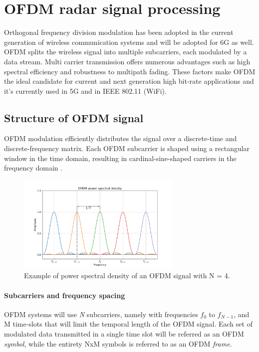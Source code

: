 \chapter{OFDM radar signal processing}
\label{chap:theoretical_OFDM}

Orthogonal frequency division modulation has been adopted in the current generation of wireless communication systems and will be adopted for 6G as well.
OFDM splits the wireless signal into multiple subcarriers, each modulated by a data stream. Multi carrier transmission offers numerous advantages such as high spectral efficiency and robustness to multipath fading. These factors make OFDM the ideal candidate for current and next generation high bit-rate applications and it's currently used in 5G and in IEEE 802.11 (WiFi).



\section{Structure of OFDM signal}

OFDM modulation efficiently distributes the signal over a discrete-time and discrete-frequency matrix. Each OFDM subcarrier is shaped using a rectangular window in the time domain, resulting in cardinal-sine-shaped carriers in the frequency domain \cite{Schaich_Wild_2014}.

\begin{figure}[H]
    \centering
    \includegraphics[width=0.7\textwidth]{Images/theoretical/ofdm/ofdm_psd_mod.png}
    \caption{Example of power spectral density of an OFDM signal with N = 4.}
    \label{fig:quadtree}
\end{figure}

\subsubsection{Subcarriers and frequency spacing}
OFDM systems will use \textit{N} subcarriers, namely with frequencies $f_0$ to $f_{N-1}$, and M time-slots that will limit the temporal length of the OFDM signal.
Each set of modulated data transmitted in a single time slot will be referred as an OFDM \textit{symbol}, while the entirety NxM symbols is referred to as an OFDM \textit{frame}.

